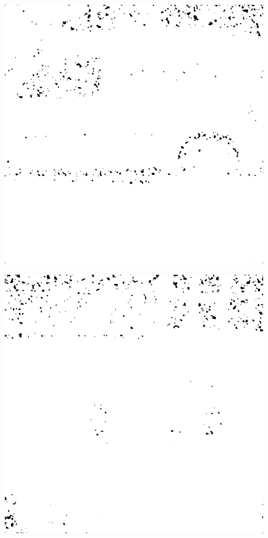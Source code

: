 \begin{figure}[H]
\vspace*{-1.2cm}
\begin{minipage}[t]{0.3\linewidth} %
	\includegraphics[width = 1\linewidth]{gfx/car/car_m30.png}
	\label{fig:car_m30}
\end{minipage}
\begin{minipage}[t]{0.3\linewidth} %
	\includegraphics[width = 1\linewidth]{gfx/hus/hus_m30.png}

\end{minipage}
\end{figure}
